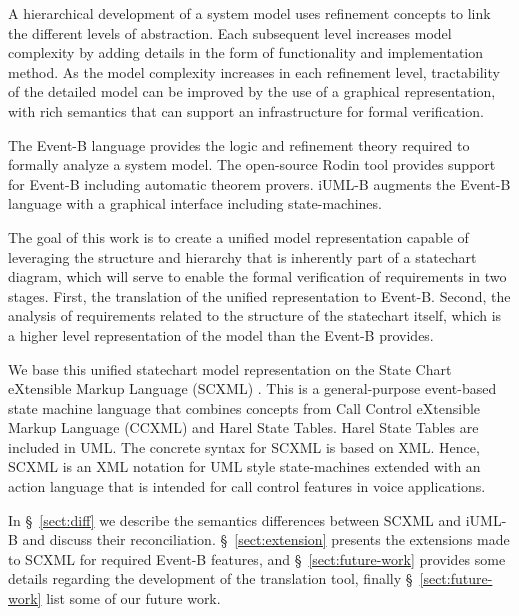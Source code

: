 \documentclass{easychair}
\begin{document}
A hierarchical development of a system model uses 
refinement concepts to link the different levels
of abstraction. Each subsequent level increases model 
complexity by adding details in the form of functionality and 
implementation method. As the model complexity increases 
in each refinement level, tractability of the detailed 
model can be improved by the use of a graphical representation, 
with rich semantics that can support an infrastructure 
for formal verification.

The Event-B language \cite{abrial10:_model_event_b} provides the logic and refinement
theory required to formally analyze a system model. 
The open-source Rodin tool \cite{abrial10:_rodin} provides support for Event-B including automatic theorem provers.
iUML-B \cite{snook14:_b_statem} augments the Event-B language with a graphical interface including state-machines.
 
 The goal of this work is to create a unified model 
representation capable of leveraging the structure and 
hierarchy that is inherently part of a statechart 
diagram, which will serve to enable the formal verification
of requirements in two stages. First, 
the translation of the unified representation to Event-B. Second,
the analysis of requirements related to the structure of 
the statechart itself, which is a higher level representation 
of the model than the Event-B provides. 

We base this unified statechart model representation 
on the State Chart eXtensible Markup 
Language (SCXML)  \cite{scxmlwebsite}.  
This is a general-purpose event-based state machine 
language that combines concepts from Call Control 
eXtensible Markup Language
(CCXML) and Harel 
State Tables. Harel State Tables are included in UML. 
The concrete syntax for SCXML
is based on XML. Hence, SCXML is an XML notation for 
UML style state-machines extended with an action 
language that is intended for call control features 
in voice applications.

In \S~\ref{sect:diff} we describe the semantics differences between SCXML and iUML-B 
and discuss their reconciliation. \S~\ref{sect:extension} presents the extensions 
made to SCXML for required Event-B  features, and \S~\ref{sect:future-work} provides some details 
regarding the development of the translation tool, finally \S~\ref{sect:future-work} list some of our future work. 

\end{document}
